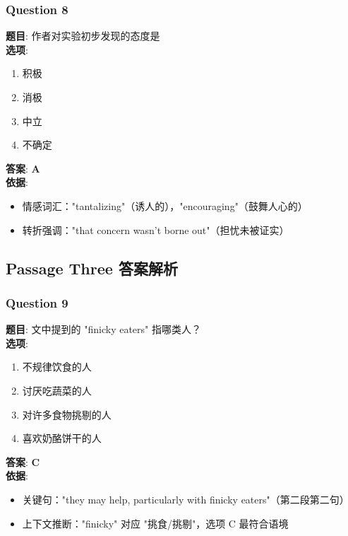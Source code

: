 \documentclass{article}
\begin{document}
\subsubsection*{Question 8}
\textbf{题目}: 作者对实验初步发现的态度是 \\
\textbf{选项}: 
\begin{enumerate}[label=\Alph*)]
    \item 积极
    \item 消极
    \item 中立
    \item 不确定
\end{enumerate}
\textbf{答案}: \textbf{A} \\
\textbf{依据}:
\begin{itemize}
    \item 情感词汇："tantalizing"（诱人的），"encouraging"（鼓舞人心的）
    \item 转折强调："that concern wasn't borne out"（担忧未被证实）
\end{itemize}

\subsection*{Passage Three 答案解析}

\subsubsection*{Question 9}
\textbf{题目}: 文中提到的 "finicky eaters" 指哪类人？ \\
\textbf{选项}: 
\begin{enumerate}[label=\Alph*)]
    \item 不规律饮食的人
    \item 讨厌吃蔬菜的人
    \item 对许多食物挑剔的人
    \item 喜欢奶酪饼干的人
\end{enumerate}
\textbf{答案}: \textbf{C} \\
\textbf{依据}:
\begin{itemize}
    \item 关键句："they may help, particularly with finicky eaters"（第二段第二句）
    \item 上下文推断："finicky" 对应 "挑食/挑剔"，选项 C 最符合语境
\end{itemize}
\end{document}
